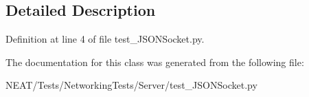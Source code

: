 \subsection{Detailed Description}


Definition at line 4 of file test\+\_\+\+J\+S\+O\+N\+Socket.\+py.



The documentation for this class was generated from the following file\+:\begin{DoxyCompactItemize}
\item 
N\+E\+A\+T/\+Tests/\+Networking\+Tests/\+Server/test\+\_\+\+J\+S\+O\+N\+Socket.\+py\end{DoxyCompactItemize}
